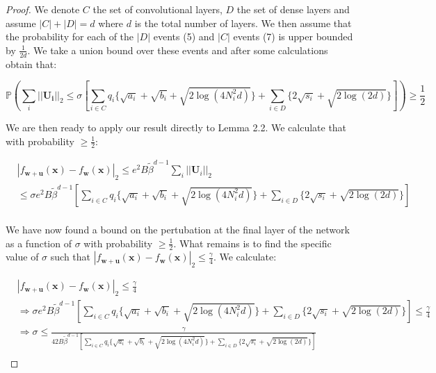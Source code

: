 \documentclass{article} %
\theoremstyle{definition}
\begin{document}
\begin{proof}
We denote $C$ the set of convolutional layers, $D$ the set of dense layers and assume $|C|+|D|=d$ where $d$ is the total number of layers. We then assume that the probability for each of the $|D|$ events (5) and $|C|$ events (7) is upper bounded by $\frac{1}{2d}$. We take a union bound over these events and after some calculations obtain that:

\begin{equation}
\mathbb{P}(\sum_{i} ||\boldsymbol{U_i}||_2 \leq \sigma[\sum_{i \in C} q_i \{\sqrt{a_i}+\sqrt{b_i}+\sqrt{2\log(4N_i^2d)} \} + \sum_{i \in D} \{2\sqrt{s_i}+\sqrt{2\log(2d)} \}]) \geq \frac{1}{2}
\end{equation}

We are then ready to apply our result directly to Lemma 2.2. We calculate that with probability $\geq \frac{1}{2}$:

\begin{equation}
\begin{split}
&|f_{\boldsymbol{w}+\boldsymbol{u} }(\boldsymbol{x})-f_{\boldsymbol{w}}(\boldsymbol{x})|_2 \leq e^2B \tilde{\beta}^{d-1} \sum_i ||\boldsymbol{U}_i||_2 \\
&\leq \sigma e^2B \tilde{\beta}^{d-1} [\sum_{i \in C} q_i \{\sqrt{a_i}+\sqrt{b_i}+\sqrt{2\log(4N_i^2d)} \} + \sum_{i \in D} \{2\sqrt{s_i}+\sqrt{2\log(2d)} \}] \\
\end{split}
\end{equation}

We have now found a bound on the pertubation at the final layer of the network as a function of $\sigma$ with probability $\geq \frac{1}{2}$. What remains is to find the specific value of $\sigma$ such that $|f_{\boldsymbol{w}+\boldsymbol{u} }(\boldsymbol{x})-f_{\boldsymbol{w}}(\boldsymbol{x})|_2 \leq \frac{\gamma}{4}$. We calculate:

\begin{equation}
\begin{split}
&|f_{\boldsymbol{w}+\boldsymbol{u} }(\boldsymbol{x})-f_{\boldsymbol{w}}(\boldsymbol{x})|_2 \leq \frac{\gamma}{4} \\
&\Rightarrow \sigma e^2B \tilde{\beta}^{d-1} [\sum_{i \in C} q_i \{\sqrt{a_i}+\sqrt{b_i}+\sqrt{2\log(4N_i^2d)} \} + \sum_{i \in D} \{2\sqrt{s_i}+\sqrt{2\log(2d)} \}] \leq \frac{\gamma}{4}\\
&\Rightarrow \sigma \leq \frac{\gamma}{42 B \tilde{\beta}^{d-1} [\sum_{i \in C} q_i \{\sqrt{a_i}+\sqrt{b_i}+\sqrt{2\log(4N_i^2d)} \} + \sum_{i \in D} \{2\sqrt{s_i}+\sqrt{2\log(2d)} \}]}\\
\end{split}
\end{equation}
\end{proof}
\end{document}
